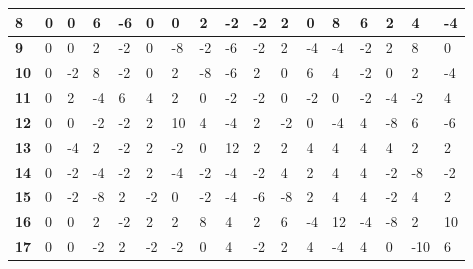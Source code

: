 \begin{longtable}[c]{|l|l|l|l|l|l|l|l|l|l|l|l|l|l|l|l|l|}
\textbf{8}  & 0          & 0          & 6          & -6         & 0          & 0          & 2          & -2         & -2         & 2          & 0           & 8           & 6           & 2           & 4           & -4          \\ \hline
\textbf{9}  & 0          & 0          & 2          & -2         & 0          & -8         & -2         & -6         & -2         & 2          & -4          & -4          & -2          & 2           & 8           & 0           \\ \hline
\textbf{10} & 0          & -2         & 8          & -2         & 0          & 2          & -8         & -6         & 2          & 0          & 6           & 4           & -2          & 0           & 2           & -4          \\ \hline
\textbf{11} & 0          & 2          & -4         & 6          & 4          & 2          & 0          & -2         & -2         & 0          & -2          & 0           & -2          & -4          & -2          & 4           \\ \hline
\textbf{12} & 0          & 0          & -2         & -2         & 2          & 10         & 4          & -4         & 2          & -2         & 0           & -4          & 4           & -8          & 6           & -6          \\ \hline
\textbf{13} & 0          & -4         & 2          & -2         & 2          & -2         & 0          & 12         & 2          & 2          & 4           & 4           & 4           & 4           & 2           & 2           \\ \hline
\textbf{14} & 0          & -2         & -4         & -2         & 2          & -4         & -2         & -4         & -2         & 4          & 2           & 4           & 4           & -2          & -8          & -2          \\ \hline
\textbf{15} & 0          & -2         & -8         & 2          & -2         & 0          & -2         & -4         & -6         & -8         & 2           & 4           & 4           & -2          & 4           & 2           \\ \hline
\textbf{16} & 0          & 0          & 2          & -2         & 2          & 2          & 8          & 4          & 2          & 6          & -4          & 12          & -4          & -8          & 2           & 10 \\ \hline
\textbf{17} & 0          & 0          & -2         & 2          & -2         & -2         & 0          & 4          & -2         & 2          & 4           & -4          & 4           & 0           & -10         & 6           \\ \hline

\end{longtable}
